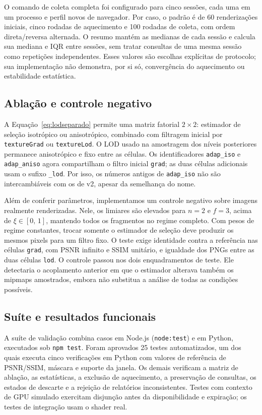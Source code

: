 O comando de coleta completa foi configurado para cinco sessões, cada uma em um processo e perfil novos de navegador. Por caso, o padrão é de 60 renderizações iniciais, cinco rodadas de aquecimento e 100 rodadas de coleta, com ordem direta/reversa alternada. O resumo mantém as medianas de cada sessão e calcula sua mediana e IQR entre sessões, sem tratar consultas de uma mesma sessão como repetições independentes. Esses valores são escolhas explícitas de protocolo; sua implementação não demonstra, por si só, convergência do aquecimento ou estabilidade estatística.

\subsection{Ablação e controle negativo}
A Equação~\ref{eq:lodseparado} permite uma matriz fatorial $2\times2$: estimador de seleção isotrópico ou anisotrópico, combinado com filtragem inicial por \texttt{textureGrad} ou \texttt{textureLod}. O LOD usado na amostragem dos níveis posteriores permanece anisotrópico e fixo entre as células. Os identificadores \texttt{adap\_iso} e \texttt{adap\_aniso} agora compartilham o filtro inicial \texttt{grad}; as duas células adicionais usam o sufixo \texttt{\_lod}. Por isso, os números antigos de \texttt{adap\_iso} não são intercambiáveis com os de v2, apesar da semelhança do nome.

Além de conferir parâmetros, implementamos um controle negativo sobre imagens realmente renderizadas. Nele, os limiares são elevados para $n=2$ e $f=3$, acima de $\xi\in[0,\,1]$, mantendo todos os fragmentos no regime completo. Com pesos de regime constantes, trocar somente o estimador de seleção deve produzir os mesmos pixels para um filtro fixo. O teste exige identidade contra a referência nas células \texttt{grad}, com PSNR infinito e SSIM unitário, e igualdade dos PNGs entre as duas células \texttt{lod}. O controle passou nos dois enquadramentos de teste. Ele detectaria o acoplamento anterior em que o estimador alterava também os mipmaps amostrados, embora não substitua a análise de todas as condições possíveis.

\subsection{Suíte e resultados funcionais}
A suíte de validação combina casos em Node.js (\texttt{node:test}) e em Python, executados sob \texttt{npm test}. Foram aprovados 25 testes automatizados, um dos quais executa cinco verificações em Python com valores de referência de PSNR/SSIM, máscara e suporte da janela. Os demais verificam a matriz de ablação, as estatísticas, a exclusão de aquecimento, a preservação de consultas, os estados de descarte e a rejeição de relatórios inconsistentes. Testes com contexto de GPU simulado exercitam disjunção antes da disponibilidade e expiração; os testes de integração usam o shader real.

